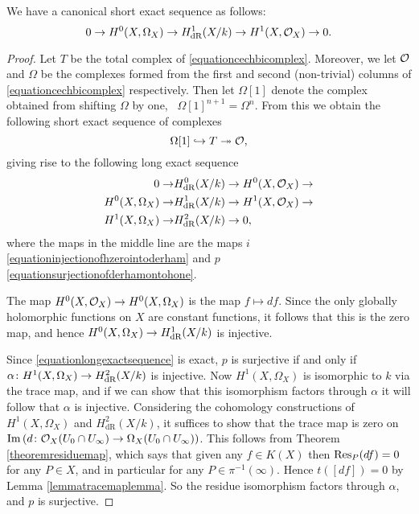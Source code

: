     \begin{prop}\label{propshortexactsequence}
    We have a canonical short exact sequence as follows:
        \begin{equation*}
        0 \rightarrow H^0(X,\Omega_X) \rightarrow H_{\text {dR}}^1(X/k) \rightarrow H^1(X,{\cal O}_X) \rightarrow 0.
        \end{equation*}
    \end{prop}
    \begin{proof}
    Let $T$ be the total complex of \eqref{equationcechbicomplex}.
    Moreover, we let ${\cal O}$ and $\Omega$ be the complexes formed from the first and second (non-trivial) columns of \eqref{equationcechbicomplex} respectively.
    Then let $\Omega[1]$ denote the complex obtained from shifting $\Omega$ by one, \ie~$\Omega[1]^{n+1} = \Omega^n$.
    From this we obtain the following short exact sequence of complexes 
        \[
        \Omega[1] \hookrightarrow T \twoheadrightarrow {\cal O},
        \]
    giving rise to the following long exact sequence
        \begin{align} \label{equationlongexactsequence}
        \begin{split}
        0 \rightarrow & H^0_{\text {dR}}(X/k) \rightarrow   H^0(X,{\cal O}_X) \rightarrow \\ 
        H^0(X,\Omega_X) \rightarrow & H_{\text {dR}}^1(X/k) \rightarrow   H^1(X,\mathcal{O}_X) \rightarrow  \\
        H^1(X,\Omega_X) \rightarrow & H^2_{\text {dR}}(X/k) \rightarrow   0, 
        \end{split}
        \end{align} 
    where the maps in the middle line are the maps $i$ \eqref{equationinjectionofhzerointoderham} and $p$ \eqref{equationsurjectionofderhamontohone}.


    The map $H^0(X,{\cal O}_X) \rightarrow {H^0(X,\Omega_X)}$ is the map $f \mapsto df$.
    Since the only globally holomorphic functions on $X$ are constant functions, it follows that this is the zero map, and hence ${H^0(X,\Omega_X)} \rightarrow H_{\text {dR}}^1(X/k)$ is injective.
    
    Since \eqref{equationlongexactsequence} is exact, $p$ is surjective if and only if $\alpha \colon H^1(X,\Omega_X) \rightarrow H^2_{\text {dR}}(X/k)$ is injective.
    Now $H^1(X,\Omega_X)$ is isomorphic to $k$ via the trace map, and if we can show that this isomorphism factors through $\alpha$ it will follow that $\alpha$ is injective.
    Considering the \cech cohomology constructions of $H^1(X,\Omega_X)$ and $H^2_{\text {dR}}(X/k)$, it suffices to show that the trace map is zero on $\operatorname{Im} \left( d \colon {\cal O}_X(U_0 \cap U_\infty) \rightarrow \Omega_X(U_0 \cap U_\infty) \right)$.
    This follows from Theorem \ref{theoremresiduemap}, which says that given any $f \in K(X)$ then $\operatorname{Res}_P(df)=0$ for any $P \in X$, and in particular for any $P \in \pi^{-1}(\infty)$.
    Hence $t\left([df]\right) = 0$ by Lemma \ref{lemmatracemaplemma}.
    So the residue isomorphism factors through $\alpha$, and $p$ is surjective.
    \end{proof}

